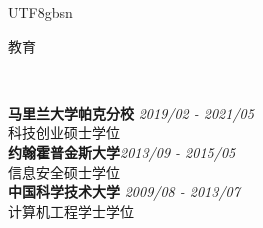 \documentclass[3pt]{article}
\newenvironment{changemargin}[2]{%
  \begin{list}{}{%
    \setlength{\topsep}{0pt}%
    \setlength{\leftmargin}{#1}%
    \setlength{\rightmargin}{#2}%
    \setlength{\listparindent}{\parindent}%
    \setlength{\itemindent}{\parindent}%
    \setlength{\parsep}{\parskip}%
  }%
  \item[]}{\end{list}
}
\newcommand{\lineover}{
	\begin{changemargin}{-0.05in}{-0.05in}
		\vspace*{-8pt}
		\hrulefill \\
		\vspace*{-2pt}
	\end{changemargin}
}
\newcommand{\header}[1]{
	\begin{changemargin}{-0.5in}{-0.5in}
		{\Large \scshape{#1}}\\
  	\lineover
	\end{changemargin}
}
\newenvironment{body} {
	\vspace*{-16pt}
	\begin{changemargin}{-0.25in}{-0.5in}
  }	
	{\end{changemargin}
}
\begin{document}
\begin{CJK}{UTF8}{gbsn}


\header{教育}

\begin{body}
	\vspace{17pt}
	\textbf{马里兰大学帕克分校} \hfill \emph{2019/02 - 2021/05} \\
	科技创业硕士学位 \\
  \smallskip
	\textbf{约翰霍普金斯大学}{}\hfill \emph{2013/09 - 2015/05}{} \\
	信息安全硕士学位 \hfill \\
  \smallskip
	\textbf{中国科学技术大学} \hfill \emph{2009/08 - 2013/07} \\
	计算机工程学士学位 \\
\end{body}




\end{CJK}
\end{document}
